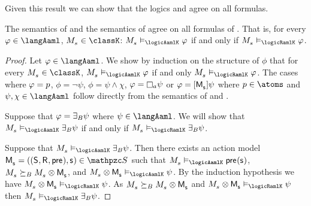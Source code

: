 Given this result we can show that the logics \logicAamlK{} and \logicRamlK{} agree on all \langAaml{} formulas.

\begin{theorem}\label{aaml-k-semantics-equivalent}
The semantics of \logicAamlK{} and the semantics of \logicRamlK{} agree on all formulas of \langAaml{}.
That is, for every $\phi \in \langAaml$, $\kPModel{\kStateS} \in \classK$: $\kPModel{\kStateS} \entails_\logicAamlK \phi$ if and only if $\kPModel{\kStateS} \entails_\logicRamlK \phi$.
\end{theorem}

\begin{proof}
Let $\phi \in \langAaml$.
We show by induction on the structure of $\phi$ that for every $\kPModel{\kStateS} \in \classK$, $\kPModel{\kStateS} \entails_\logicAamlK \phi$ if and only $\kPModel{\kStateS} \entails_\logicRamlK \phi$.
The cases where $\varphi = p$, $\phi = \lnot \psi$,  $\phi = \psi \land \chi$, $\phi = \necessaryA \psi$ or $\phi = \actionA{\aPModel{\aStateS}} \psi$ where $\atomP \in \atoms$ and $\psi, \chi \in \langAaml$ follow directly from the semantics of \logicAamlK{} and \logicRamlK{}.

Suppose that $\varphi = {\exists_{B}} \psi$ where $\psi \in \langAaml$. 
We will show that $\kPModel{\kStateS} \entails_\logicAamlK \someactsBs \psi$ if and only if $\kPModel{\kStateS} \entails_\logicRamlK \someactsBs \psi$.

Suppose that $\kPModel{\kStateS} \entails_\logicAamlK \someactsBs \psi$.
Then there exists an action model $\aPModelAndTuple{\aStateS} \in \aSignatureFamily$ such that $\kPModel{\kStateS} \entails_\logicAamlK \aPrecondition(\aStateS)$, $\kPModel{\kStateS} \simulatesBs \kPModel{\kStateS} \exec \aPModel{\aStateS}$, and $\kPModel{\kStateS} \exec \aPModel{\aStateS} \entails_\logicAamlK \psi$.
By the induction hypothesis we have $\kPModel{\kStateS} \exec \aPModel{\aStateS} \entails_\logicRamlK \psi$.
As $\kPModel{\kStateS} \simulatesBs \kPModel{\kStateS} \exec \aPModel{\aStateS}$ and $\kPModel{\kStateS} \exec \aPModel{\aStateS} \entails_\logicRamlK \psi$ then $\kPModel{\kStateS} \entails_\logicRamlK \someactsBs \psi$.


\end{proof}

